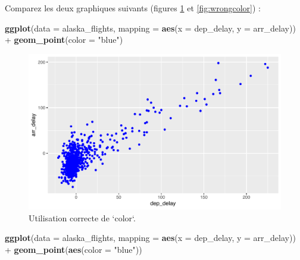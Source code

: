 \documentclass[
  a4paper,
]{article}
\newenvironment{Shaded}{\begin{snugshade}}{\end{snugshade}}
\newcommand{\DataTypeTok}[1]{\textcolor[rgb]{0.00,0.34,0.68}{#1}}
\newcommand{\KeywordTok}[1]{\textcolor[rgb]{0.12,0.11,0.11}{\textbf{#1}}}
\newcommand{\NormalTok}[1]{\textcolor[rgb]{0.12,0.11,0.11}{#1}}
\newcommand{\OperatorTok}[1]{\textcolor[rgb]{0.12,0.11,0.11}{#1}}
\newcommand{\StringTok}[1]{\textcolor[rgb]{0.75,0.01,0.01}{#1}}
\begin{document}
Comparez les deux graphiques suivants (figures \ref{fig:rightcolor} et \ref{fig:wrongcolor}) :

\begin{Shaded}
\begin{Highlighting}[]
\KeywordTok{ggplot}\NormalTok{(}\DataTypeTok{data =}\NormalTok{ alaska_flights, }\DataTypeTok{mapping =} \KeywordTok{aes}\NormalTok{(}\DataTypeTok{x =}\NormalTok{ dep_delay, }\DataTypeTok{y =}\NormalTok{ arr_delay)) }\OperatorTok{+}
\StringTok{  }\KeywordTok{geom_point}\NormalTok{(}\DataTypeTok{color =} \StringTok{"blue"}\NormalTok{)}
\end{Highlighting}
\end{Shaded}

\begin{figure}[htpb]

{\centering \includegraphics[width=0.9\linewidth]{figure/rightcolor-1} 

}

\caption{Utilisation correcte de `color`.}\label{fig:rightcolor}
\end{figure}

\begin{Shaded}
\begin{Highlighting}[]
\KeywordTok{ggplot}\NormalTok{(}\DataTypeTok{data =}\NormalTok{ alaska_flights, }\DataTypeTok{mapping =} \KeywordTok{aes}\NormalTok{(}\DataTypeTok{x =}\NormalTok{ dep_delay, }\DataTypeTok{y =}\NormalTok{ arr_delay)) }\OperatorTok{+}
\StringTok{  }\KeywordTok{geom_point}\NormalTok{(}\KeywordTok{aes}\NormalTok{(}\DataTypeTok{color =} \StringTok{"blue"}\NormalTok{))}
\end{Highlighting}
\end{Shaded}
\end{document}
